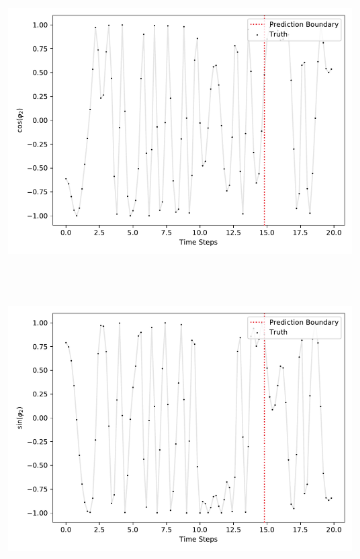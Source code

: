 \begin{figure}
\begin{subfigure}{0.5\linewidth}
					\includegraphics[width=\linewidth]{figures/experiments/environments/observations-acrobot-gym-N0-D2.pdf}
				\end{subfigure}%
				~
				\begin{subfigure}{0.5\linewidth}
					\centering
					\includegraphics[width=\linewidth]{figures/experiments/environments/observations-acrobot-gym-N0-D3.pdf}
				\end{subfigure} \\
				\begin{subfigure}{0.5\linewidth}
					\centering

\end{subfigure}
\end{figure}
